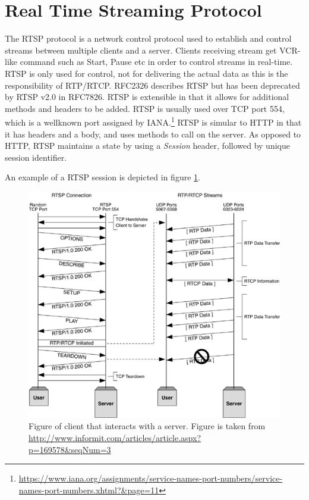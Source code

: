\section{Real Time Streaming Protocol} \label{sec:design:rtsp}
The RTSP protocol is a network control protocol used to establish and control streams between multiple clients and a server. Clients receiving stream get \ac{VCR}-like command such as Start, Pause etc in order to control streams in real-time. RTSP is only used for control, not for delivering the actual data as this is the responsibility of RTP/RTCP.
RFC2326 describes RTSP but has been deprecated by RTSP v2.0 in RFC7826. RTSP is extensible in that it allows for additional methods and headers to be added.
RTSP is usually used over TCP port 554, which is a wellknown port assigned by IANA.\footnote{\url{https://www.iana.org/assignments/service-names-port-numbers/service-names-port-numbers.xhtml?&page=11}} RTSP is simular to HTTP in that it has headers and a body, and uses methods to call on the server. As opposed to HTTP, RTSP maintains a state by using a \textit{Session} header, followed by unique session identifier.

An example of a RTSP session is depicted in figure \ref{fig:design:rtsp:example}.
\begin{figure}[H]
	\centering
	\includegraphics[width=\textwidth]{figures/rtsp_example}
	\caption{Figure of client that interacts with a server. Figure is taken from \url{http://www.informit.com/articles/article.aspx?p=169578&seqNum=3}}
	\label{fig:design:rtsp:example}
\end{figure}

